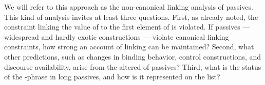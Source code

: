 \documentclass[output=paper
	        ,collection
	        ,collectionchapter
 	        ,biblatex
                ,babelshorthands
                ,newtxmath
                ,draftmode
                ,colorlinks, citecolor=brown
]{langscibook}
\begin{document}

 \ea
\label{pass-lr}
 

\z
We will refer to this approach as the non-canonical linking analysis of passives. This kind of analysis invites at least three questions.
First, as already noted, the constraint linking the value of  to the first element of \argst is violated.
If passives --- widespread and hardly exotic constructions --- violate canonical linking constraints, how strong an account of linking can be maintained?
Second, what other predictions, such as changes in binding behavior, control constructions, and discourse availability, arise from the altered \argst of passives?
Third, what is the status of the -phrase in long passives, and how is it represented on the \argst list?
\end{document}
